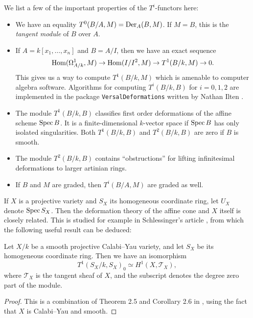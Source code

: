 We list a few of the important properties of the $T^i$-functors here:

\begin{itemize}
	\item We have an equality $T^0(B/A,M) = \operatorname{Der}_A(B,M)$. If $M=B$, this is the \emph{tangent module} of $B$ over $A$.
	\item If $A=k[x_1,\ldots,x_n]$ and $B=A/I$, then we have an exact sequence
	\begin{equation}
	\label{eq:t1seq}
	\operatorname{Hom}(\Omega_{A/k}^1,M) \to \operatorname{Hom}(I/I^2,M) \to T^1(B/k,M) \to 0.
	\end{equation}
	This gives us a way to compute $T^1(B/k,M)$ which is amenable to computer algebra software. Algorithms for computing $T^i(B/k,B)$ for $i=0,1,2$ are implemented in the \MM package \texttt{VersalDeformations} written by Nathan Ilten \cite{ilten_versaldeformations}.
	\item The module $T^1(B/k,B)$ classifies first order deformations of the affine scheme $\operatorname{Spec} B$. It is a finite-dimensional $k$-vector space if $\operatorname{Spec} B$ has only isolated singularities. Both $T^1(B/k,B)$ and $T^2(B/k,B)$ are zero if $B$ is smooth.
	\item The module $T^2(B/k,B)$ contains ``obstructions'' for lifting infinitesimal deformations to larger artinian rings.
	\item If $B$ and $M$ are graded, then $T^i(B/A,M)$ are graded as well. 
\end{itemize}

If $X$ is a projective variety and $S_X$ its homogeneous coordinate ring, let $U_X$ denote $\operatorname{Spec} S_X$. Then the deformation theory of the affine cone and $X$ itself is closely related. This is studied for example in Schlessinger's article \cite{schlessinger_rigid}, from which the following useful result can be deduced:

\begin{proposition}
\label{prop:t1h1}
Let $X/k$ be a smooth projective Calabi--Yau variety, and let $S_X$ be its homogeneous coordinate ring. Then we have an isomorphism
$$
T^1(S_X/k,S_X)_0  \simeq H^1(X, \mathcal T_X),
$$
where $\mathcal T_X$ is the tangent sheaf of $X$, and the subscript denotes the degree zero part of the module.
\end{proposition}

\begin{proof}
This is a combination of Theorem 2.5 and Corollary 2.6 in \cite{t1_ref}, using the fact that $X$ is Calabi--Yau and smooth.
\end{proof}

